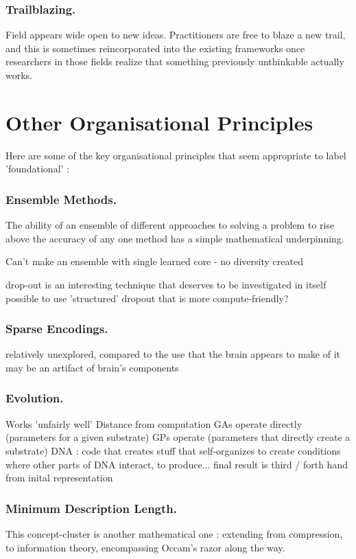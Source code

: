 \documentclass[citeauthoryear]{llncs}
\begin{document}
\subsubsection*{Trailblazing.}
Field appears wide open to new ideas.  Practitioners are free to blaze a new trail, 
and this is sometimes reincorporated into the existing frameworks once 
researchers in those fields realize that something previously unthinkable actually works.


\section{Other Organisational Principles}

Here are some of the key organisational principles that seem appropriate to label 'foundational' :

\subsubsection*{Ensemble Methods.}
The ability of an ensemble of different approaches to solving a problem to rise above the accuracy 
of any one method has a simple mathematical underpinning.  

Can't make an ensemble with single learned core - no diversity created

drop-out is an interesting technique that deserves to be investigated in itself
  possible to use 'structured' dropout that is more compute-friendly?


\subsubsection*{Sparse Encodings.}
  relatively unexplored, compared to the use that the brain appears to make of it
    may be an artifact of brain's components
    
\subsubsection*{Evolution.}
  Works 'unfairly well'
  Distance from computation
    GAs operate directly (parameters for a given substrate)
    GPs operate (parameters that directly create a substrate)
    DNA : code that creates stuff that self-organizes to create conditions where 
      other parts of DNA interact, to produce...   
        final result is third / forth hand from inital representation

\subsubsection*{Minimum Description Length.}
This concept-cluster is another mathematical one : extending from compression, to information theory,
encompassing Occam's razor along the way.
\end{document}
